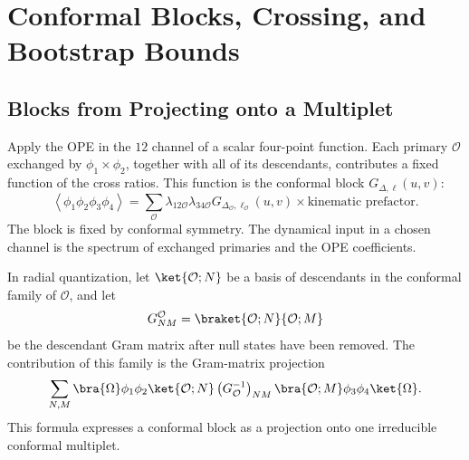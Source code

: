 \chapter{Conformal Blocks, Crossing, and Bootstrap Bounds}
\label{ch:volume-iii-conformal-blocks-crossing-bootstrap}

\section{Blocks from Projecting onto a Multiplet}

Apply the OPE in the \(12\) channel of a scalar four-point function.  Each
primary \(\mathcal O\) exchanged by \(\phi_1\times\phi_2\), together with all
of its descendants, contributes a fixed function of the cross ratios.  This
function is the conformal block \(G_{\Delta,\ell}(u,v)\):
\begin{equation}
  \left\langle\phi_1\phi_2\phi_3\phi_4\right\rangle
  =
  \sum_{\mathcal O}
  \lambda_{12\mathcal O}\lambda_{34\mathcal O}
  G_{\Delta_{\mathcal O},\ell_{\mathcal O}}(u,v)
  \times
  \text{kinematic prefactor}.
  \label{eq:four-point-block-decomposition}
\end{equation}
The block is fixed by conformal symmetry.  The dynamical input in a chosen
channel is the spectrum of exchanged primaries and the OPE coefficients.

In radial quantization, let \(\ket{\mathcal O;N}\) be a basis of descendants
in the conformal family of \(\mathcal O\), and let
\[
  G_{NM}^{\mathcal O}
  =
  \braket{\mathcal O;N}{\mathcal O;M}
\]
be the descendant Gram matrix after null states have been removed.  The
contribution of this family is the Gram-matrix projection
\begin{equation}
  \sum_{N,M}
  \bra{\Omega}\phi_1\phi_2\ket{\mathcal O;N}
  \left(G_{\mathcal O}^{-1}\right)_{NM}
  \bra{\mathcal O;M}\phi_3\phi_4\ket{\Omega}.
  \label{eq:block-gram-matrix-projection}
\end{equation}
This formula expresses a conformal block as a projection onto one irreducible
conformal multiplet.

